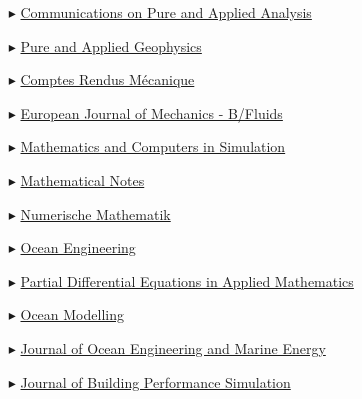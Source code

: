 \begin{itemize}
    \item[$\blacktriangleright$] \href{http://aimsciences.org/journals/cpaa/}%
    {Communications on Pure and Applied Analysis}

    \item[$\blacktriangleright$] \href{https://www.springer.com/journal/24}%
    {Pure and Applied Geophysics}
    
    \item[$\blacktriangleright$] \href{http://www.sciencedirect.com/science/journal/16310721}%
    {Comptes Rendus M\'ecanique}
    
    \item[$\blacktriangleright$]  \href{http://www.elsevier.com/wps/find/journaldescription.cws_home/600738/description}%
    {European Journal of Mechanics - B/Fluids}
    
    \item[$\blacktriangleright$] \href{http://www.elsevier.com/wps/find/journaldescription.cws_home/505615/description#description}%
    {Mathematics and Computers in Simulation}

    \item[$\blacktriangleright$] \href{https://link.springer.com/journal/11006/}{Mathematical Notes}
    
    \item[$\blacktriangleright$] \href{http://www.springerlink.com/content/100497/}%
    {Numerische Mathematik}
    
    \item[$\blacktriangleright$] \href{http://www.journals.elsevier.com/ocean-engineering/}%
    {Ocean Engineering}

    \item[$\blacktriangleright$] \href{https://www.sciencedirect.com/journal/partial-differential-equations-in-applied-mathematics/}{Partial Differential Equations in Applied Mathematics}
    
    \item[$\blacktriangleright$] \href{http://www.elsevier.com/wps/find/journaldescription.cws_home/601376/description#description}%
    {Ocean Modelling}
    
    \item[$\blacktriangleright$] \href{http://www.springer.com/engineering/civil+engineering/journal/40722/}{Journal of Ocean Engineering and Marine Energy}
    
    \item[$\blacktriangleright$] \href{https://www.tandfonline.com/toc/tbps20/current/}{Journal of Building Performance Simulation}


\end{itemize}
